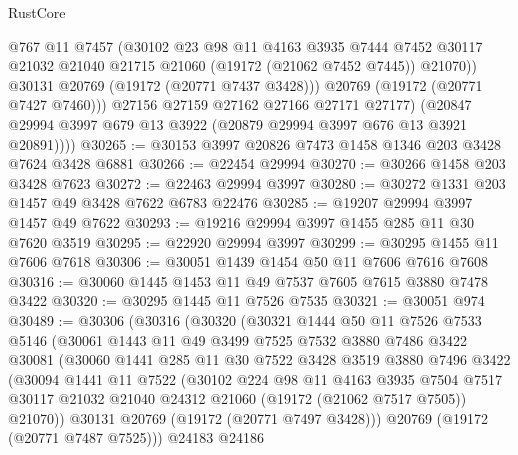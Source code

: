 \begin{lexlean}{RustCore}
\begin{coremodule}
                @767
                @11
                @7457
                (@30102
                  @23
                  @98
                  @11
                  @4163
                  @3935
                  @7444
                  @7452
                  @30117
                  @21032
                  @21040
                  @21715
                  @21060
                  (@19172 (@21062 @7452 @7445))
                  @21070))
              @30131
              @20769
              (@19172 (@20771 @7437 @3428)))
            @20769
            (@19172 (@20771 @7427 @7460)))
          @27156
          @27159
          @27162
          @27166
          @27171
          @27177)
        (@20847 @29994 @3997 @679 @13 @3922 (@20879 @29994 @3997 @676 @13 @3921 @20891))))
@30265 := @30153 @3997 @20826 @7473 @1458 @1346 @203 @3428 @7624 @3428 @6881
@30266 := @22454 @29994
@30270 := @30266 @1458 @203 @3428 @7623
@30272 := @22463 @29994 @3997
@30280 := @30272 @1331 @203 @1457 @49 @3428 @7622 @6783 @22476
@30285 := @19207 @29994 @3997 @1457 @49 @7622
@30293 := @19216 @29994 @3997 @1455 @285 @11 @30 @7620 @3519
@30295 := @22920 @29994 @3997
@30299 := @30295 @1455 @11 @7606 @7618
@30306 := @30051 @1439 @1454 @50 @11 @7606 @7616 @7608
@30316 := @30060 @1445 @1453 @11 @49 @7537 @7605 @7615 @3880 @7478 @3422
@30320 := @30295 @1445 @11 @7526 @7535
@30321 := @30051 @974
@30489 := @30306
    (@30316
      (@30320
        (@30321
          @1444
          @50
          @11
          @7526
          @7533
          @5146
          (@30061
            @1443
            @11
            @49
            @3499
            @7525
            @7532
            @3880
            @7486
            @3422
            @30081
            (@30060
              @1441
              @285
              @11
              @30
              @7522
              @3428
              @3519
              @3880
              @7496
              @3422
              (@30094
                @1441
                @11
                @7522
                (@30102
                  @224
                  @98
                  @11
                  @4163
                  @3935
                  @7504
                  @7517
                  @30117
                  @21032
                  @21040
                  @24312
                  @21060
                  (@19172 (@21062 @7517 @7505))
                  @21070))
              @30131
              @20769
              (@19172 (@20771 @7497 @3428)))
            @20769
            (@19172 (@20771 @7487 @7525)))
          @24183
          @24186

\end{coremodule}
\end{lexlean}
